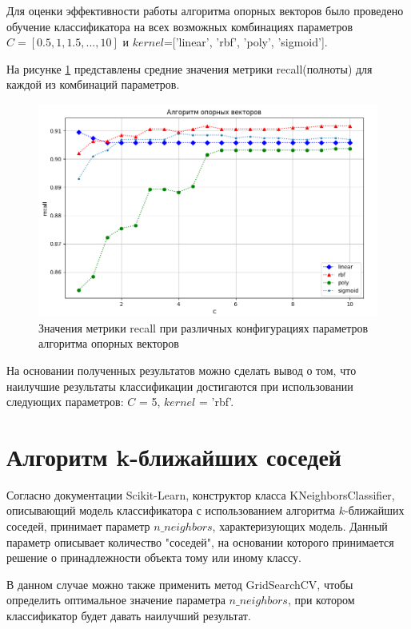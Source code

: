 Для оценки эффективности работы алгоритма опорных векторов было проведено обучение классификатора на всех возможных комбинациях параметров $C=[0.5, 1, 1.5, ... , 10]$ и $kernel$=['linear', 'rbf', 'poly', 'sigmoid'].

На рисунке \ref{res:svm-graphs} представлены средние значения метрики recall(полноты) для каждой из комбинаций параметров.

\begin{figure}[h!]
	\centering
	\includegraphics[width=\textwidth]{inc/img/svm-graphs.png}
	\caption{Значения метрики recall при различных конфигурациях параметров алгоритма опорных векторов}
	\label{res:svm-graphs}
\end{figure}

На основании полученных результатов можно сделать вывод о том, что наилучшие результаты классификации достигаются при использовании следующих параметров: $C$ = 5, $kernel$ = 'rbf'. 


\section{Алгоритм k-ближайших соседей}
Согласно документации Scikit-Learn, конструктор класса KNeighborsClassifier, описывающий модель классификатора с использованием алгоритма $k$-ближайших соседей, принимает  параметр $n\_neighbors$, характеризующих модель. Данный параметр описывает количество "соседей"\space, на основании которого принимается решение о принадлежности объекта тому или иному классу.

В данном случае можно также применить метод GridSearchCV, чтобы определить оптимальное значение параметра $n\_neighbors$, при котором классификатор будет давать наилучший результат.

